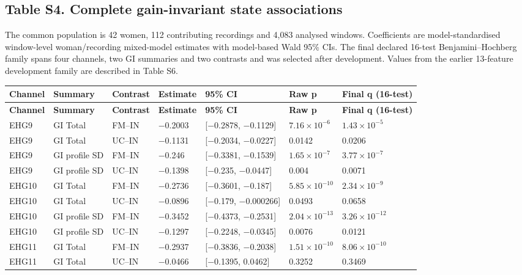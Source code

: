 \documentclass[10pt]{article}
\begin{document}
\clearpage
\begin{landscape}
\section*{Table S4. Complete gain-invariant state associations}\label{tab:s4_gi_associations}
The common population is 42 women, 112 contributing recordings and 4,083 analysed windows. Coefficients are model-standardised window-level woman/recording mixed-model estimates with model-based Wald 95\% CIs. The final declared 16-test Benjamini--Hochberg family spans four channels, two GI summaries and two contrasts and was selected after development. Values from the earlier 13-feature development family are described in Table S6.
\begin{longtable}{p{1.5cm}p{2.5cm}p{2.4cm}p{1.4cm}p{3.2cm}p{1.8cm}p{2.0cm}}
\toprule
\textbf{Channel} & \textbf{Summary} & \textbf{Contrast} & \textbf{Estimate} & \textbf{95\% CI} & \textbf{Raw p} & \textbf{Final q (16-test)} \\
\midrule
\endfirsthead
\toprule
\textbf{Channel} & \textbf{Summary} & \textbf{Contrast} & \textbf{Estimate} & \textbf{95\% CI} & \textbf{Raw p} & \textbf{Final q (16-test)} \\
\midrule
\endhead
EHG9 & GI Total & FM--IN & $-$0.2003 & [$-$0.2878, $-$0.1129] & $7.16\times10^{-6}$ & $1.43\times10^{-5}$ \\
EHG9 & GI Total & UC--IN & $-$0.1131 & [$-$0.2034, $-$0.0227] & 0.0142 & 0.0206 \\
EHG9 & GI profile SD & FM--IN & $-$0.246 & [$-$0.3381, $-$0.1539] & $1.65\times10^{-7}$ & $3.77\times10^{-7}$ \\
EHG9 & GI profile SD & UC--IN & $-$0.1398 & [$-$0.235, $-$0.0447] & 0.004 & 0.0071 \\
EHG10 & GI Total & FM--IN & $-$0.2736 & [$-$0.3601, $-$0.187] & $5.85\times10^{-10}$ & $2.34\times10^{-9}$ \\
EHG10 & GI Total & UC--IN & $-$0.0896 & [$-$0.179, $-$0.000266] & 0.0493 & 0.0658 \\
EHG10 & GI profile SD & FM--IN & $-$0.3452 & [$-$0.4373, $-$0.2531] & $2.04\times10^{-13}$ & $3.26\times10^{-12}$ \\
EHG10 & GI profile SD & UC--IN & $-$0.1297 & [$-$0.2248, $-$0.0345] & 0.0076 & 0.0121 \\
EHG11 & GI Total & FM--IN & $-$0.2937 & [$-$0.3836, $-$0.2038] & $1.51\times10^{-10}$ & $8.06\times10^{-10}$ \\
EHG11 & GI Total & UC--IN & $-$0.0466 & [$-$0.1395, 0.0462] & 0.3252 & 0.3469 \\

\end{longtable}
\end{landscape}
\end{document}
